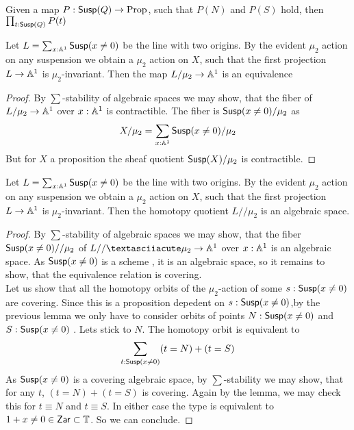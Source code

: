 \begin{lemma}
	Given a map $P : \mathsf{Susp}(Q) \to \operatorname{Prop}$, such that $P(N)$ and $P(S)$ hold, then $\prod_{t: \mathsf{Susp}(Q)} P(t)$
\end{lemma}
\begin{example}
	Let $L = \sum_{x : \mathbb{A}^1} \mathsf{Susp}(x \neq 0)$ be the line with two origins. By the evident $\mu_2$ action on any suspension we obtain a $\mu_2$ action on $X$, such that the first projection $L \to \mathbb{A}^1$ is $\mu_2$-invariant. Then the map $L / \mu_2 \to \mathbb{A}^1$ is an equivalence
\end{example}
\begin{proof}
	By $\sum$-stability of algebraic spaces we may show, that the fiber of $L / \mu_2 \to \mathbb{A}^1$ over $x : \mathbb{A}^1$ is contractible. The fiber is $\mathsf{Susp}(x \neq 0) / \mu_2$ as 
	\[
	X / \mu_2 = \sum_{x : \mathbb{A}^1} \mathsf{Susp}(x \neq 0)/\mu_2
	\]
	 But for $X$ a proposition the sheaf quotient $\mathsf{Susp}(X) / \mu_2$ is contractible.	
\end{proof}

\begin{example}[TODO]
	Let $L = \sum_{x : \mathbb{A}^1} \mathsf{Susp}(x \neq 0)$ be the line with two origins. By the evident $\mu_2$ action on any suspension we obtain a $\mu_2$ action on $X$, such that the first projection $L \to \mathbb{A}^1$ is $\mu_2$-invariant. Then the homotopy quotient $L // \mu_2$ is an algebraic space.	
\end{example}
\begin{proof}
	By $\sum$-stability of algebraic spaces we may show, that the fiber $\mathsf{Susp}(x \neq 0) // \mu_2$ of $L //´ \mu_2 \to \bA^1$ over $x : \mathbb{A}^1$ is an algebraic space. As $\mathsf{Susp}(x \neq 0)$ is a scheme \todocite, it is an algebraic space, so it remains to show, that the equivalence relation is covering. \\
	Let us show that all the homotopy orbits of the $\mu_2$-action of some $s : \mathsf{Susp}(x \neq 0)$ are covering. Since this is a proposition depedent on $s : \mathsf{Susp}(x \neq 0)$,by the previous lemma we only have to consider orbits of points $N : \mathsf{Susp}(x\neq0)$ and $S : \mathsf{Susp}(x \neq 0)$ . Lets stick to $N$. The homotopy orbit is equivalent to 
	\[
	\sum_{t : \Susp(x \neq 0)}  (t = N) + (t = S) %
	\]
	As $\mathsf{Susp}(x \neq 0)$ is a covering algebraic space, by $\sum$-stability we may show, that for any $t$, $(t = N) + (t = S)$ is covering. Again by the lemma, we may check this for $t \equiv N$ and $t \equiv S$. In either case the type is equivalent to $1 + x \neq 0 \in \mathsf{Zar} \subset \mathbb{T}$. So we can conclude.
\end{proof}


